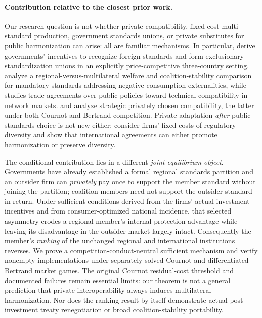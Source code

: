 %
\paragraph{Contribution relative to the closest prior work.}
Our research question is not whether private compatibility,
fixed-cost multi-standard production, government standards unions,
or private substitutes for public harmonization can arise:
all are familiar mechanisms.  In particular,
\citet{gandalShy2001} derive governments' incentives to
recognize foreign standards and form exclusionary standardization
unions in an explicitly price-competitive three-country setting.
\citet{takaradaEtAl2020} analyze a regional-versus-multilateral
welfare and coalition-stability comparison for mandatory
standards addressing negative consumption externalities, while
\citet{klimenko2009} studies trade agreements over public policies
toward technical compatibility in network markets.
\citet{buccellaEtAl2023} and \citet{buccellaEtAl2026}
analyze strategic privately chosen compatibility, the latter
under both Cournot and Bertrand competition.  Private adaptation
\emph{after} public standards choice is not new either:
\citet{maggiMrazova2024} consider firms' fixed costs of
regulatory diversity and show that international agreements
can either promote harmonization or preserve diversity.

The conditional contribution lies in a different \emph{joint
equilibrium object}.  Governments have already established a
formal regional standards partition and an outsider firm can
\emph{privately} pay once to support the member standard without
joining the partition; coalition members need not support the
outsider standard in return.  Under sufficient conditions derived
from the firms' actual investment incentives and from
consumer-optimized national incidence, that selected asymmetry
erodes a regional member's internal protection advantage while
leaving its disadvantage in the outsider market largely intact.
Consequently the member's \emph{ranking} of the unchanged regional
and international institutions reverses.  We prove a
competition-conduct-neutral sufficient mechanism and verify
nonempty implementations under separately solved Cournot
and differentiated Bertrand market games.  The original
Cournot residual-cost threshold and documented failures
remain essential limits: our theorem is not a general
prediction that private interoperability always induces
multilateral harmonization.  Nor does the ranking result
by itself demonstrate actual post-investment treaty
renegotiation or broad coalition-stability portability.

